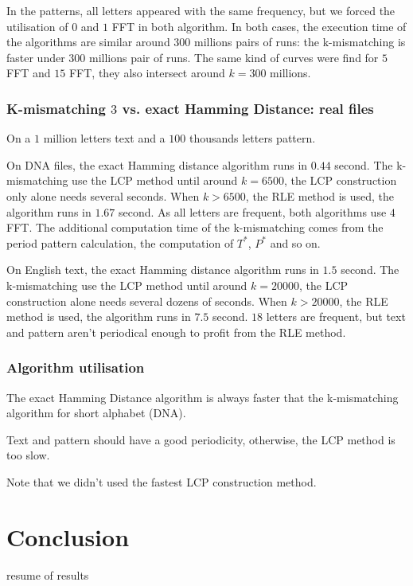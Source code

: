 \documentclass[preprint,12pt]{elsarticle}
\begin{document}
In the patterns, all letters appeared with the same frequency,
but we forced the utilisation of $0$ and $1$ FFT in both algorithm.
In both cases, the execution time of the algorithms are similar around $300$ millions pairs of runs:
the k-mismatching is faster under $300$ millions pair of runs.
The same kind of curves were find for $5$ FFT and $15$ FFT, they also intersect around $k=300$ millions.



\subsubsection{K-mismatching $3$ vs. exact Hamming Distance: real files}

On a $1$ million letters text and a $100$ thousands letters pattern.

On DNA files, the exact Hamming distance algorithm runs in $0.44$ second.
The k-mismatching use the LCP method until around $k=6500$,
the LCP construction only alone needs several seconds.
When $k>6500$, the RLE method is used, the algorithm runs in $1.67$ second.
As all letters are frequent, both algorithms use $4$ FFT.
The additional computation time of the k-mismatching  comes from the period pattern calculation,
the computation of $T^*$, $P^*$ and so on.

On English text, the exact Hamming distance algorithm runs in $1.5$ second.
The k-mismatching use the LCP method until around $k=20000$,
the LCP construction alone needs several dozens of seconds.
When $k>20000$, the RLE method is used, the algorithm runs in $7.5$ second.
$18$ letters are frequent, but text and pattern aren't periodical enough to profit from the RLE method.



\subsubsection{Algorithm utilisation}
The exact Hamming Distance algorithm is always faster that the k-mismatching algorithm for short alphabet (DNA).

Text and pattern should have a good periodicity, otherwise, the LCP method is too slow.

Note that we didn't used the fastest LCP construction method.








\section*{Conclusion}
resume of results
\end{document}
